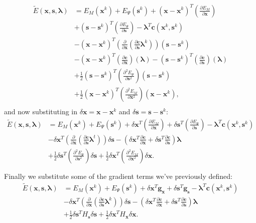 \documentclass[letterpaper,12pt]{article}
\theoremstyle{remark}
\newcommand{\x}{\mathbf{x}}
\newcommand{\C}{\mathbf{c}}
\newcommand{\s}{\mathbf{s}}
\newcommand{\la}{\mathbf{\lambda}}
\newcommand{\dx}{\delta \x}
\newcommand{\ds}{\delta \s}
\newcommand{\Hx}{ {H_\x} }
\newcommand{\Hs}{ {H_\s} }
\newcommand{\gx}{ {\mathbf{g}_\x} }
\newcommand{\gs}{ {\mathbf{g}_\s} }
\begin{document}
\begin{equation}
\begin{split}
\tilde{E}(\x,\s,\la) &=  E_M(\x^k) + E_\Psi(\s^k) + 
(\x - \x^k)^T \left(\frac{\partial E_M}{\partial \x} \right)  \\
&+ (\s - \s^k)^T \left(\frac{\partial E_\Psi}{\partial \s} \right)   
 - \la^T \C (\x^k, \s^k) \\
& - (\x - \x^k)^T \left(
  \frac{\partial}{\partial \x} \left(\frac{\partial \C}{\partial \s} \la^k\right) \right)(\s - \s^k) \\
& - (\x - \x^k)^T \left(
  \frac{\partial \C }{\partial \x} \right)(\la) 
- (\s - \s^k)^T \left(
  \frac{\partial \C }{\partial \s} \right)(\la) \\
& + \frac{1}{2}(\s- \s^k)^T \left(\frac{\partial^2 E_\Psi}{\partial \s^2} \right)(\s - \s^k) \\
& + \frac{1}{2}(\x- \x^k)^T \left(\frac{\partial^2 E_M}{\partial \x^2}
\right)(\x - \x^k), \\
\end{split}
\end{equation}
and now substituting in $\dx = \x - \x^k$ and $\ds = \s - \s^k$:
\begin{equation}
\begin{split}
\tilde{E}(\x,\s,\la) &=  E_M(\x^k) + E_\Psi(\s^k) + 
\dx^T \left(\frac{\partial E_M}{\partial \x} \right) 
+ \ds^T \left(\frac{\partial E_\Psi}{\partial \s} \right)   
 - \la^T \C (\x^k, \s^k) \\
& - \dx^T \left(
  \frac{\partial}{\partial \x} \left(\frac{\partial \C}{\partial \s} \la^t\right) \right)\ds
- \left( \dx^T 
  \frac{\partial \C }{\partial \x}
+  \ds^T  
  \frac{\partial \C }{\partial \s} \right) \la \\
&+ \frac{1}{2}\ds^T \left(\frac{\partial^2 E_\Psi}{\partial \s^2} \right)\ds
+ \frac{1}{2} \dx^T \left(\frac{\partial^2 E_M}{\partial \x^2}
\right)\dx. \\
&\\
\end{split}
\end{equation}
Finally we substitute some of the gradient terms we've previously defined:
\begin{equation}
\begin{split}
\tilde{E}(\x,\s,\la) &=  E_M(\x^k) + E_\Psi(\s^k) + 
\dx^T \gx
+ \ds^T \gs
 - \la^T \C (\x^k, \s^k) \\
& - \dx^T \left(
  \frac{\partial}{\partial \x} \left(\frac{\partial \C}{\partial \s} \la^k\right) \right)\ds
- \left( \dx^T 
  \frac{\partial \C }{\partial \x}
+  \ds^T  
  \frac{\partial \C }{\partial \s} \right) \la \\
& + \frac{1}{2}\ds^T \Hs \ds
+ \frac{1}{2} \dx^T \Hx \dx. \\
\end{split}
\end{equation}
\end{document}
